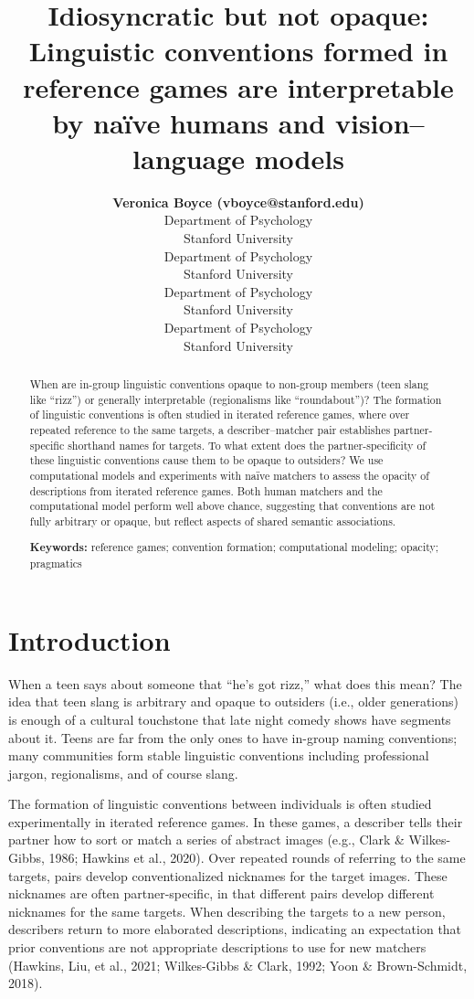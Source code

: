 \documentclass[10pt, letterpaper]{article}
\title{Idiosyncratic but not opaque: Linguistic conventions formed in
reference games are interpretable by naïve humans and vision--language
models}
\author{{\large \bf Veronica Boyce (vboyce@stanford.edu)} \\ Department of Psychology \\ Stanford University \And {\large \bf Ben Prystawski (benpry@stanford.edu)} \\Department of Psychology \\ Stanford University \AND {\large \bf Alvin Wei Ming Tan (tanawm@stanford.edu)} \\ Department of Psychology \\ Stanford University \And {\large \bf Michael C. Frank (mcfrank@stanford.edu)} \\ Department of Psychology \\ Stanford University}
\begin{document}
\maketitle

\begin{abstract}
When are in-group linguistic conventions opaque to non-group members
(teen slang like ``rizz'') or generally interpretable (regionalisms like
``roundabout'')? The formation of linguistic conventions is often
studied in iterated reference games, where over repeated reference to
the same targets, a describer--matcher pair establishes partner-specific
shorthand names for targets. To what extent does the partner-specificity
of these linguistic conventions cause them to be opaque to outsiders? We
use computational models and experiments with naïve matchers to assess
the opacity of descriptions from iterated reference games. Both human
matchers and the computational model perform well above chance,
suggesting that conventions are not fully arbitrary or opaque, but
reflect aspects of shared semantic associations.

\textbf{Keywords:}
reference games; convention formation; computational modeling; opacity;
pragmatics
\end{abstract}

\section{Introduction}\label{introduction}

When a teen says about someone that ``he's got rizz,'' what does this
mean? The idea that teen slang is arbitrary and opaque to outsiders
(i.e., older generations) is enough of a cultural touchstone that late
night comedy shows have segments about it. Teens are far from the only
ones to have in-group naming conventions; many communities form stable
linguistic conventions including professional jargon, regionalisms, and
of course slang.

The formation of linguistic conventions between individuals is often
studied experimentally in iterated reference games. In these games, a
describer tells their partner how to sort or match a series of abstract
images (e.g., Clark \& Wilkes-Gibbs, 1986; Hawkins et al., 2020). Over
repeated rounds of referring to the same targets, pairs develop
conventionalized nicknames for the target images. These nicknames are
often partner-specific, in that different pairs develop different
nicknames for the same targets. When describing the targets to a new
person, describers return to more elaborated descriptions, indicating an
expectation that prior conventions are not appropriate descriptions to
use for new matchers (Hawkins, Liu, et al., 2021; Wilkes-Gibbs \& Clark,
1992; Yoon \& Brown-Schmidt, 2018).
\end{document}
